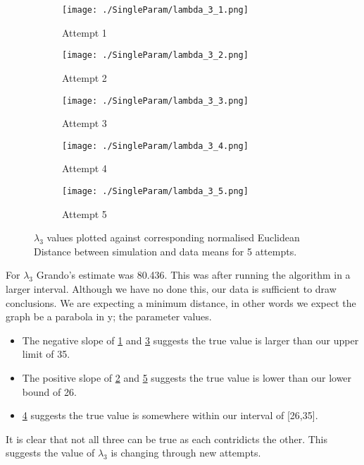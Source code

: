 \begin{figure}
    \begin{subfigure}{.3\textwidth}
      \centering
      \texttt{[image: ./SingleParam/lambda\_3\_1.png]}
      \caption{Attempt 1}
      \label{singlelam:1}
    \end{subfigure}
    \begin{subfigure}{.3\textwidth}
      \centering
      \texttt{[image: ./SingleParam/lambda\_3\_2.png]}
      \caption{Attempt 2}
      \label{singlelam:2}
    \end{subfigure}
    \begin{subfigure}{.3\textwidth}
        \centering
        \texttt{[image: ./SingleParam/lambda\_3\_3.png]}
        \caption{Attempt 3}
        \label{singlelam:3}
    \end{subfigure}

    \centering
    \begin{subfigure}{.3\textwidth} 
        \centering
        \texttt{[image: ./SingleParam/lambda\_3\_4.png]}
        \caption{Attempt 4}
        \label{singlelam:4}
    \end{subfigure}
    \begin{subfigure}{.3\textwidth}
        \centering
        \texttt{[image: ./SingleParam/lambda\_3\_5.png]}
        \caption{Attempt 5}
        \label{singlelam:5}
    \end{subfigure}

    \caption{$\lambda_3$ values plotted against corresponding normalised Euclidean Distance between simulation and data means for 5 attempts.}
    \label{singlelam}
\end{figure}

For $\lambda_3$ Grando's estimate was 80.436. This was after running the algorithm in a larger interval. Although we have no done this, our data is sufficient to draw conclusions. We are expecting a minimum distance, in other words we expect the graph be a parabola in y; the parameter values.
\begin{itemize}
    \item The negative slope of \ref{singlelam:1} and \ref{singlelam:3} suggests the true value is larger than our upper limit of 35. 
    \item The positive slope of \ref{singlelam:2} and \ref{singlelam:5} suggests the true value is lower than our lower bound of 26. 
    \item \ref{singlelam:4} suggests the true value is somewhere within our interval of [26,35]. 
\end{itemize}
It is clear that not all three can be true as each contridicts the other. This suggests the value of $\lambda_3$ is changing through new attempts.





